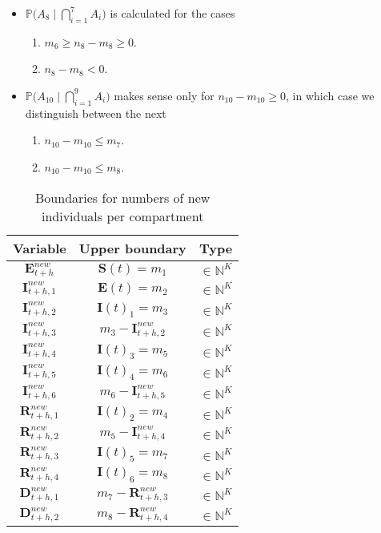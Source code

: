 \documentclass[a4paper]{article}
\renewcommand{\vec}[1]{\boldsymbol{#1}}
\theoremstyle{remark}
\begin{document}
\begin{itemize}
\begin{enumerate}
        \end{enumerate}
        \item $\mathbb{P}\big(A_{8}\mid \bigcap_{i=1}^{7}A_{i}\big)$ is calculated for the cases
        \begin{enumerate}
            \item $m_6\geq n_8-m_8\geq 0$.
            \item $n_8-m_8< 0$.
        \end{enumerate}
        \item $\mathbb{P}\big(A_{10}\mid \bigcap_{i=1}^{9}A_{i}\big)$ makes sense only for $n_{10}-m_{10}\geq 0$, in which case we distinguish between the next 
        \begin{enumerate}
            \item $n_{10}-m_{10}\leq m_7$.
            \item $n_{10}-m_{10}\leq m_8$.
        \end{enumerate}
        
    \end{itemize}
    
\begin{table}[t]
    \centering
    \begin{tabular}{c | c | c}
        Variable & Upper boundary & Type\\
        \hline
        $\vec{E}^{new}_{t+h}$ & $\vec{S}(t)=m_1$ & ${} \in \mathbb{N}^K$\\
        $\vec{I}^{new}_{t+h,1}$ & $\vec{E}(t)=m_2$ & ${} \in \mathbb{N}^K$\\
        $\vec{I}^{new}_{t+h,2}$ & $\vec{I}(t)_1=m_3$ & ${} \in \mathbb{N}^K$\\
        $\vec{I}^{new}_{t+h,3}$ & $m_3-\vec{I}^{new}_{t+h,2}$ & ${} \in \mathbb{N}^K$\\
        $\vec{I}^{new}_{t+h,4}$ & $\vec{I}(t)_3=m_5$ & ${} \in \mathbb{N}^K$\\
        $\vec{I}^{new}_{t+h,5}$ &  $\vec{I}(t)_4=m_6$  & ${} \in \mathbb{N}^K$\\
        $\vec{I}^{new}_{t+h,6}$ & $m_6-\vec{I}^{new}_{t+h,5}$ & ${} \in \mathbb{N}^K$\\
        $\vec{R}^{new}_{t+h,1}$ & $\vec{I}(t)_2=m_4$ & ${} \in \mathbb{N}^K$\\
        $\vec{R}^{new}_{t+h,2}$ & $m_5-\vec{I}^{new}_{t+h,4}$ & ${} \in \mathbb{N}^{K}$\\
        $\vec{R}^{new}_{t+h,3}$ & $\vec{I}(t)_5=m_7$ & ${} \in \mathbb{N}^K$\\
        $\vec{R}^{new}_{t+h,4}$ & $\vec{I}(t)_6=m_8$ & ${} \in \mathbb{N}^K$\\
        $\vec{D}^{new}_{t+h,1}$ & $m_7-\vec{R}^{new}_{t+h,3}$ & ${} \in \mathbb{N}^K$\\
        $\vec{D}^{new}_{t+h,2}$ & $m_8-\vec{R}^{new}_{t+h,4}$ & ${} \in \mathbb{N}^K$
    \end{tabular}
    \caption{Boundaries for numbers of new individuals per compartment}
    \label{tab:my_constraints_table}
\end{table}
    
\end{document}
